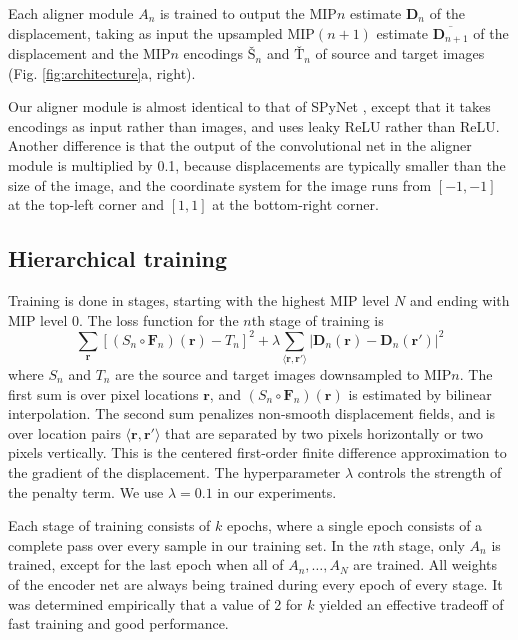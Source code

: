 \documentclass{article}
\renewcommand{\vec}[1]{\mathbf{#1}}
\begin{document}
Each aligner module $A_n$ is trained to output the MIP$n$ estimate $\vec{D}_n$ of the displacement, taking as input the upsampled MIP$(n+1)$ estimate $\overline{\vec{D}_{n+1}}$ of the displacement and the MIP$n$ encodings $\text{\v{S}}_n$ and $\text{\v{T}}_n$ of source and target images (Fig. \ref{fig:architecture}a, right).

Our aligner module is almost identical to that of SPyNet \citep{ranjan2017optical}, except that it takes encodings as input rather than images, and uses leaky ReLU \citep{maas2013rectifier} rather than ReLU. Another difference is that the output of the convolutional net in the aligner module is multiplied by 0.1, because displacements are typically smaller than the size of the image, and the coordinate system for the image runs from $[-1,-1]$ at the top-left corner and $[1,1]$ at the bottom-right corner. 

\subsection{Hierarchical training}
Training is done in stages, starting with the highest MIP level $N$ and ending with MIP level 0. The loss function for the $n$th stage of training is
\begin{equation}\label{eq:LossFunctionStage}
\sum_\vec{r}[(S_n \circ \vec{F}_n)(\vec{r})-T_n]^2 + \lambda \sum_{\langle\vec{r},\vec{r}'\rangle}\left|\vec{D}_n(\vec{r})-\vec{D}_n(\vec{r}')\right|^2
\end{equation}
where $S_n$ and $T_n$ are the source and target images downsampled to MIP$n$. The first sum is over pixel locations $\vec{r}$, and $(S_n \circ \vec{F}_n)(\vec{r})$ is estimated by bilinear interpolation. The second sum penalizes non-smooth displacement fields, and is over location pairs $\langle\vec{r},\vec{r}'\rangle$ that are separated by two pixels horizontally or two pixels vertically. This is the centered first-order finite difference approximation to the gradient of the displacement. The hyperparameter $\lambda$ controls the strength of the penalty term. We use $\lambda=0.1$ in our experiments.

Each stage of training consists of $k$ epochs, where a single epoch consists of a complete pass over every sample in our training set. In the $n$th stage, only $A_n$ is trained, except for the last epoch when all of $A_n,\ldots,A_N$ are trained. All weights of the encoder net are always being trained during every epoch of every stage. It was determined empirically that a value of 2 for $k$ yielded an effective tradeoff of fast training and good performance.
\end{document}
